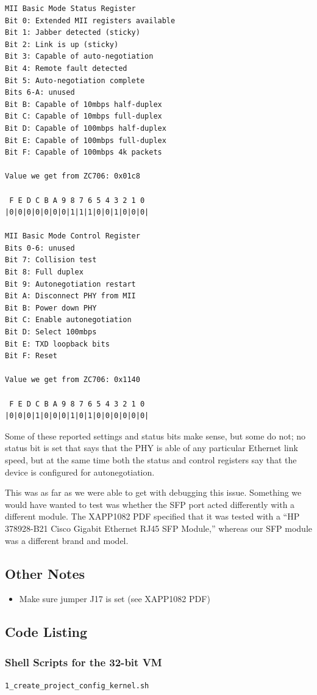 \documentclass[12pt]{report}
\begin{document}
\begin{verbatim}
MII Basic Mode Status Register
Bit 0: Extended MII registers available
Bit 1: Jabber detected (sticky)
Bit 2: Link is up (sticky)
Bit 3: Capable of auto-negotiation
Bit 4: Remote fault detected
Bit 5: Auto-negotiation complete
Bits 6-A: unused
Bit B: Capable of 10mbps half-duplex
Bit C: Capable of 10mbps full-duplex
Bit D: Capable of 100mbps half-duplex
Bit E: Capable of 100mbps full-duplex
Bit F: Capable of 100mbps 4k packets

Value we get from ZC706: 0x01c8

 F E D C B A 9 8 7 6 5 4 3 2 1 0
|0|0|0|0|0|0|0|1|1|1|0|0|1|0|0|0|

MII Basic Mode Control Register
Bits 0-6: unused
Bit 7: Collision test
Bit 8: Full duplex
Bit 9: Autonegotiation restart
Bit A: Disconnect PHY from MII
Bit B: Power down PHY
Bit C: Enable autonegotiation
Bit D: Select 100mbps
Bit E: TXD loopback bits
Bit F: Reset

Value we get from ZC706: 0x1140

 F E D C B A 9 8 7 6 5 4 3 2 1 0
|0|0|0|1|0|0|0|1|0|1|0|0|0|0|0|0|
\end{verbatim}

Some of these reported settings and status bits make sense, but some do not; no status bit is set that says that the PHY is able of any particular Ethernet link speed, but at the same time both the status and control registers say that the device is configured for autonegotiation.

This was as far as we were able to get with debugging this issue. Something we would have wanted to test was whether the SFP port acted differently with a different module. The XAPP1082 PDF specified that it was tested with a ``HP 378928-B21 Cisco Gigabit Ethernet RJ45 SFP Module,'' whereas our SFP module was a different brand and model.

\subsection{Other Notes}
\begin{itemize}
\item Make sure jumper J17 is set (see XAPP1082 PDF)
\end{itemize}
\subsection{Code Listing}
\subsubsection{Shell Scripts for the 32-bit VM}
\texttt{1\_create\_project\_config\_kernel.sh}

\end{document}
